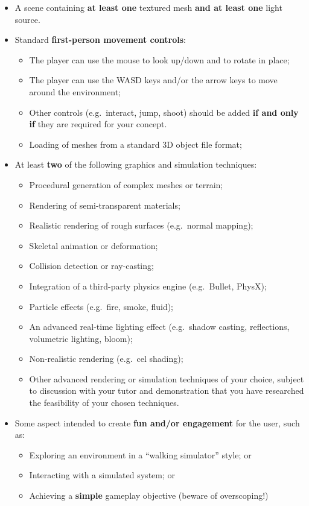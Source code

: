 \documentclass{../../fal_assignment}
\begin{document}
\begin{itemize}
	\item A scene containing \textbf{at least one} textured mesh \textbf{and at least one} light source.
	\item Standard \textbf{first-person movement controls}:
		\begin{itemize}
			\item The player can use the mouse to look up/down and to rotate in place;
			\item The player can use the WASD keys and/or the arrow keys to move around the environment;
			\item Other controls (e.g.\ interact, jump, shoot) should be added
				\textbf{if and only if} they are required for your concept.
			\item Loading of meshes from a standard 3D object file format;
		\end{itemize}
	\item At least \textbf{two} of the following graphics and simulation techniques:
		\begin{itemize}
			\item Procedural generation of complex meshes or terrain;
			\item Rendering of semi-transparent materials;
			\item Realistic rendering of rough surfaces (e.g.\ normal mapping);
			\item Skeletal animation or deformation;
			\item Collision detection or ray-casting;
			\item Integration of a third-party physics engine (e.g.\ Bullet, PhysX);
			\item Particle effects (e.g.\ fire, smoke, fluid);
			\item An advanced real-time lighting effect (e.g.\ shadow casting, reflections, volumetric lighting, bloom);
			\item Non-realistic rendering (e.g.\ cel shading);
			\item Other advanced rendering or simulation techniques of your choice,
				subject to discussion with your tutor
				and demonstration that you have researched the feasibility of your chosen techniques.
		\end{itemize}
	\item Some aspect intended to create \textbf{fun and/or engagement} for the user,
		such as:
		\begin{itemize}
			\item Exploring an environment in a ``walking simulator'' style; or
			\item Interacting with a simulated system; or
			\item Achieving a \textbf{simple} gameplay objective (beware of overscoping!)
		\end{itemize}
\end{itemize}
\end{document}
